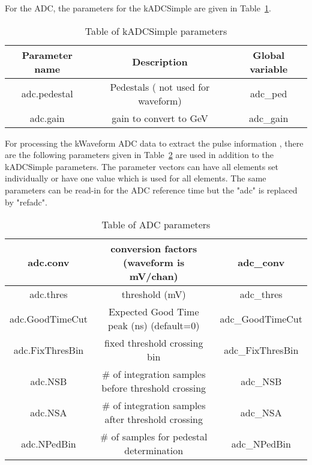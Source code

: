 \documentclass[11pt]{article}
\begin{document}
For the ADC, the parameters for the kADCSimple are given in Table~\ref{tab:adcsimpleparam}.
\begin{table}[h]
\begin{center}
	\begin{tabular}{|c|c|c|}
		\hline 
		Parameter name	& Description &  Global variable\\ 
		\hline 
		adc.pedestal	&  Pedestals ( not used for waveform) & adc\_ped \\ 
		\hline 
		adc.gain	&  gain to convert to GeV & adc\_gain\\ 
		\hline
	\end{tabular} 
\caption{Table of kADCSimple parameters}\label{tab:adcsimpleparam}
\end{center}
\end{table}
For processing the kWaveform ADC data to extract the pulse information , there are the following parameters
given in Table~\ref{tab:adcwaveparam} are used in addition to the kADCSimple parameters. The parameter vectors can have all elements set individually or have one value which is used for all elements.  
The same parameters can be read-in for the ADC reference time but the "adc" is replaced by "refadc".
\begin{table}[h]
	\begin{center}
		\begin{tabular}{|c|c|c|}
		\hline 
        adc.conv	&  conversion factors  (waveform is mV/chan) & adc\_conv\\ 
		\hline 
adc.thres	&  threshold  (mV) & adc\_thres\\ 
\hline 
       adc.GoodTimeCut &  Expected Good Time peak (ns) (default=0) & adc\_GoodTimeCut \\
\hline
adc.FixThresBin	&  fixed threshold crossing bin  & adc\_FixThresBin\\ 
\hline 
adc.NSB	&  \# of integration samples before threshold crossing  & adc\_NSB\\ 
\hline 
adc.NSA	&  \# of integration samples after threshold crossing  & adc\_NSA\\ 
\hline 
adc.NPedBin	&  \# of samples for pedestal determination  & adc\_NPedBin\\ 
\hline 
	\end{tabular} 
\caption{Table of ADC parameters}\label{tab:adcwaveparam}
\end{center}
\end{table}
\end{document}
